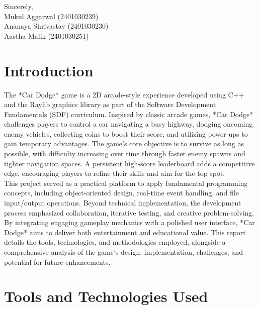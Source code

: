 \documentclass[12pt,a4paper]{article}
\begin{document}
\vspace{2em}

\noindent
Sincerely, \\
\vspace{2em}
\noindent
Mukul Aggarwal (2401030239)\\
Ananaya Shrivastav (2401030230) \\
Aastha Malik (2401030251) \\

\newpage

\tableofcontents

\newpage

\section{Introduction}

The *Car Dodge* game is a 2D arcade-style experience developed using C++ and the Raylib graphics library as part of the Software Development Fundamentals (SDF) curriculum. Inspired by classic arcade games, *Car Dodge* challenges players to control a car navigating a busy highway, dodging oncoming enemy vehicles, collecting coins to boost their score, and utilizing power-ups to gain temporary advantages. The game’s core objective is to survive as long as possible, with difficulty increasing over time through faster enemy spawns and tighter navigation spaces. A persistent high-score leaderboard adds a competitive edge, encouraging players to refine their skills and aim for the top spot. \\

This project served as a practical platform to apply fundamental programming concepts, including object-oriented design, real-time event handling, and file input/output operations. Beyond technical implementation, the development process emphasized collaboration, iterative testing, and creative problem-solving. By integrating engaging gameplay mechanics with a polished user interface, *Car Dodge* aims to deliver both entertainment and educational value. This report details the tools, technologies, and methodologies employed, alongside a comprehensive analysis of the game’s design, implementation, challenges, and potential for future enhancements. \\

\section{Tools and Technologies Used}
\end{document}
